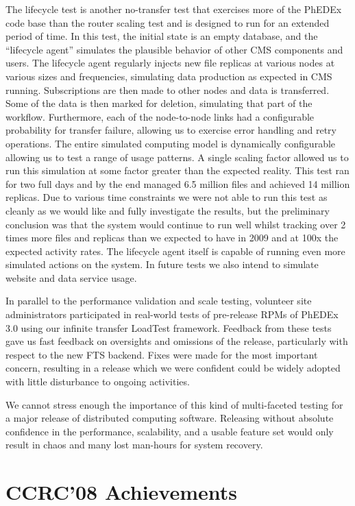 \documentclass{PoS}
\begin{document}
The lifecycle test is another no-transfer test that exercises more of
the PhEDEx code base than the router scaling test and is designed to
run for an extended period of time.  In this test, the initial state
is an empty database, and the ``lifecycle agent'' simulates the
plausible behavior of other CMS components and users.  The lifecycle
agent regularly injects new file replicas at various nodes at various
sizes and frequencies, simulating data production as expected in CMS
running.  Subscriptions are then made to other nodes and data is
transferred.  Some of the data is then marked for deletion, simulating
that part of the workflow.  Furthermore, each of the node-to-node
links had a configurable probability for transfer failure, allowing us
to exercise error handling and retry operations.  The entire simulated
computing model is dynamically configurable allowing us to test a
range of usage patterns.  A single scaling factor allowed us to run
this simulation at some factor greater than the expected reality.
This test ran for two full days and by the end managed 6.5 million
files and achieved 14 million replicas.  Due to various time
constraints we were not able to run this test as cleanly as we would
like and fully investigate the results, but the preliminary conclusion
was that the system would continue to run well whilst tracking over 2
times more files and replicas than we expected to have in 2009 and at
100x the expected activity rates.  The lifecycle agent itself is
capable of running even more simulated actions on the system.  In
future tests we also intend to simulate website and data service
usage.

In parallel to the performance validation and scale testing, volunteer
site administrators participated in real-world tests of pre-release
RPMs of PhEDEx 3.0 using our infinite transfer LoadTest framework.
Feedback from these tests gave us fast feedback on oversights and
omissions of the release, particularly with respect to the new FTS
backend.  Fixes were made for the most important concern, resulting in
a release which we were confident could be widely adopted with little
disturbance to ongoing activities.

We cannot stress enough the importance of this kind of multi-faceted
testing for a major release of distributed computing software.
Releasing without absolute confidence in the performance, scalability,
and a usable feature set would only result in chaos and many lost
man-hours for system recovery.

\section{CCRC'08 Achievements}
\end{document}
